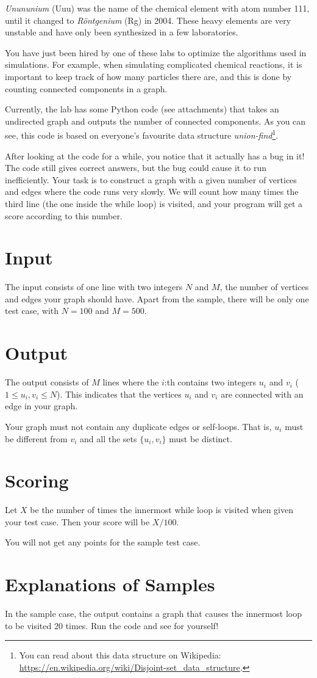 
\emph{Unununium} (Uuu) was the name of the chemical element with atom number 111, until it changed to
\emph{Röntgenium} (Rg) in 2004. These heavy elements are very unstable and have only been synthesized
in a few laboratories.

You have just been hired by one of these labs to optimize the algorithms used in simulations.
For example, when simulating complicated chemical reactions, it is important to keep track of 
how many particles there are, and this is done by counting connected components in a graph.

Currently, the lab has some Python code (see attachments) that takes an undirected graph and 
outputs the number of connected components. As you can see, this code is based on everyone's
favourite data structure \emph{union-find}\footnote{
  You can read about this data structure on Wikipedia: \url{https://en.wikipedia.org/wiki/Disjoint-set\_data\_structure}.
}.

After looking at the code for a while, you notice that it actually has a bug in it!  The code still 
gives correct answers, but the bug could cause it to run inefficiently.
Your task is to construct a graph with a given number of vertices and edges where the code runs very slowly.
We will count how many times the third line (the one inside the while loop) is visited, and your program will get a score according to this number.

\section*{Input}
The input consists of one line with two integers $N$ and $M$, the number of vertices and edges
your graph should have. Apart from the sample, there will be only one test case, with $N = 100$
and $M = 500$.

\section*{Output}
The output consists of $M$ lines where the $i$:th contains two integers $u_i$ and $v_i$
($1 \leq u_i, v_i \leq N$). This indicates that the vertices $u_i$ and $v_i$ are connected
with an edge in your graph.

Your graph must not contain any duplicate edges or self-loops. That is, $u_i$ must be different
from $v_i$ and all the sets $\{u_i, v_i\}$ must be distinct.


\section*{Scoring}
Let $X$ be the number of times the innermost while loop is visited when given your test case.
Then your score will be $X / 100$.

You will not get any points for the sample test case.

\section*{Explanations of Samples}
In the sample case, the output contains a graph that causes the innermost loop to be visited $20$
times. Run the code and see for yourself!
